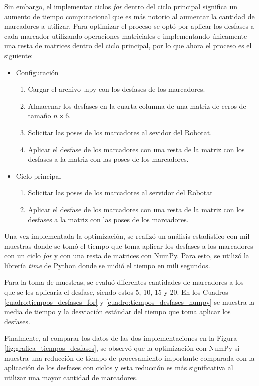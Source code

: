 Sin embargo, el implementar ciclos \textit{for} dentro del ciclo principal significa un aumento de tiempo computacional que es más notorio al aumentar la cantidad de marcadores a utilizar. Para optimizar el proceso se optó por aplicar los desfases a cada marcador utilizando operaciones matriciales e implementando únicamente una resta de matrices dentro del ciclo principal, por lo que ahora el proceso es el siguiente:

\begin{itemize}
	\item Configuración
	\begin{enumerate}
		\item Cargar el archivo .npy con los desfases de los marcadores.
		\item Almacenar los desfases en la cuarta columna de una matriz de ceros de tamaño $n \times 6$.
		\item Solicitar las poses de los marcadores al sevidor del Robotat.
		\item Aplicar el desfase de los marcadores con una resta de la matriz con los desfases a la matriz con las poses de los marcadores.
	\end{enumerate}
	\item Ciclo principal 
	\begin{enumerate}
		\item Solicitar las poses de los marcadores al servidor del Robotat
		\item Aplicar el desfase de los marcadores con una resta de la matriz con los desfases a la matriz con las poses de los marcadores.
	\end{enumerate}
\end{itemize}

Una vez implementada la optimización, se realizó un análisis estadístico con mil muestras donde se tomó el tiempo que toma aplicar los desfases a los marcadores con un ciclo \textit{for} y con una resta de matrices con NumPy. Para esto, se utilizó la librería \textit{time} de Python donde se midió el tiempo en mili segundos.

Para la toma de muestras, se evaluó diferentes cantidades de marcadores a los que se les aplicaría el desfase, siendo estos 5, 10, 15 y 20. En los Cuadros \ref{cuadro:tiempos_desfases_for} y \ref{cuadro:tiempos_desfases_numpy} se muestra la media de tiempo y la desviación estándar del tiempo que toma aplicar los desfases.

Finalmente, al comparar los datos de las dos implementaciones en la Figura \ref{fig:grafica_tiempos_desfases}, se observó que la optimización con NumPy si muestra una reducción de tiempo de procesamiento importante comparada con la aplicación de los desfases con ciclos  y esta reducción es más significativa al utilizar una mayor cantidad de marcadores.

